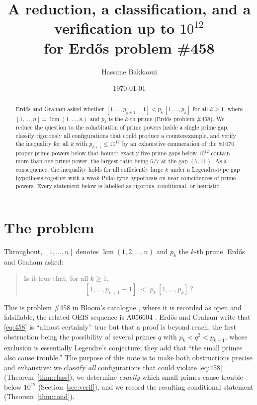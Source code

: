 \documentclass[11pt]{amsart}
\title[A reduction and verification for Erd\H{o}s problem \#458]{A reduction, a classification, and a verification up to $10^{12}$\\ for Erd\H{o}s problem \#458}
\author{Hassane Bakkaoui}
\date{\today}
\theoremstyle{definition}
\theoremstyle{remark}
\newcommand{\lcm}{\operatorname{lcm}}
\begin{document}
\begin{abstract}
Erd\H{o}s and Graham asked whether $[1,\ldots,p_{k+1}-1] < p_k\,[1,\ldots,p_k]$ for all $k\ge 1$, where $[1,\ldots,n]=\lcm(1,\ldots,n)$ and $p_k$ is the $k$-th prime (Erd\H{o}s problem \#458). We reduce the question to the cohabitation of prime powers inside a single prime gap, classify rigorously all configurations that could produce a counterexample, and verify the inequality for all $k$ with $p_{k+1}\le 10^{12}$ by an exhaustive enumeration of the $80\,070$ proper prime powers below that bound: exactly five prime gaps below $10^{12}$ contain more than one prime power, the largest ratio being $6/7$ at the gap $(7,11)$. As a consequence, the inequality holds for all sufficiently large $k$ under a Legendre-type gap hypothesis together with a weak Pillai-type hypothesis on near-coincidences of prime powers. Every statement below is labelled as rigorous, conditional, or heuristic.
\end{abstract}

\maketitle

\section{The problem}

Throughout, $[1,\ldots,n]$ denotes $\lcm(1,2,\ldots,n)$ and $p_k$ the $k$-th prime. Erd\H{o}s and Graham \cite[p.~91]{ErGr80} asked:

\begin{quote}
Is it true that, for all $k\ge 1$,
\begin{equation}\label{eq:458}
[1,\ldots,p_{k+1}-1] \;<\; p_k\,[1,\ldots,p_k]\,?
\end{equation}
\end{quote}

This is problem \#458 in Bloom's catalogue \cite{Bl458}, where it is recorded as open and falsifiable; the related OEIS sequence is A056604 \cite{OEIS}. Erd\H{o}s and Graham write that \eqref{eq:458} is ``almost certainly'' true but that a proof is beyond reach, the first obstruction being the possibility of several primes $q$ with $p_k<q^2<p_{k+1}$, whose exclusion is essentially Legendre's conjecture; they add that ``the small primes also cause trouble.'' The purpose of this note is to make both obstructions precise and exhaustive: we classify \emph{all} configurations that could violate \eqref{eq:458} (Theorem~\ref{thm:class}), we determine \emph{exactly} which small primes cause trouble below $10^{12}$ (Section~\ref{sec:verif}), and we record the resulting conditional statement (Theorem~\ref{thm:cond}).
\end{document}
